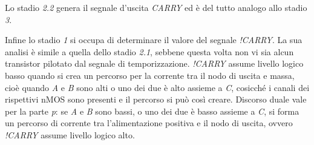 Lo stadio \textit{2.2} genera il segnale d'uscita \textit{CARRY} ed è del tutto analogo allo stadio \textit{3}.

Infine lo stadio \textit{1} si occupa di determinare il valore del segnale \textit{!CARRY}. La sua analisi è simile a quella dello stadio \textit{2.1}, sebbene questa volta non vi sia alcun transistor pilotato dal segnale di temporizzazione. \textit{!CARRY} assume livello logico basso quando si crea un percorso per la corrente tra il nodo di uscita e massa, cioè quando \textit{A} e \textit{B} sono alti o uno dei due è alto assieme a \textit{C}, cosicché i canali dei rispettivi nMOS sono presenti e il percorso si può così creare. Discorso duale vale per la parte \textit{p}: se \textit{A} e \textit{B} sono bassi, o uno dei due è basso assieme a \textit{C}, si forma un percorso di corrente tra l'alimentazione positiva e il nodo di uscita, ovvero \textit{!CARRY} assume livello logico alto.



